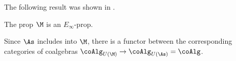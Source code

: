 The following result was shown in \cite{Medina20prop1}.

\begin{proposition}
	The prop $\M$ is an $E_\infty$-prop.
\end{proposition}

Since $\As$ includes into $\M$, there is a functor between the corresponding categories of coalgebras $\coAlg_{U(\M)} \to \coAlg_{U(\As)} = \coAlg$.
